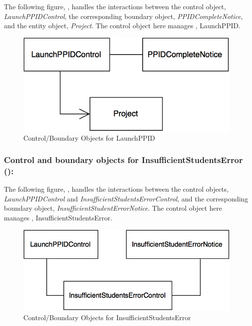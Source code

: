 \documentclass[12pt,letterpaper]{article}
\begin{document}
The following figure, , handles the interactions between the control object, {\it LaunchPPIDControl}, the corresponding boundary object, {\it PPIDCompleteNotice}, and the entity object, {\it Project}. The control object here manages , LaunchPPID.

\begin{figure}[H]
	\centering{}
	\includegraphics[scale=0.37]{imgs/cbod/launch-ppid.png}
	\caption{Control/Boundary Objects for LaunchPPID}
\end{figure}

\subsubsection*{Control and boundary objects for InsufficientStudentsError ():}

The following figure, , handles the interactions between the control objects, {\it LaunchPPIDControl} and {\it InsufficientStudentsErrorControl}, and the corresponding boundary object, {\it InsufficientStudentErrorNotice}. The control object here manages , InsufficientStudentsError.

\begin{figure}[H]
	\centering{}
	\includegraphics[scale=0.37]{imgs/cbod/insufficient-students-error.png}
	\caption{Control/Boundary Objects for InsufficientStudentsError}
\end{figure}
\end{document}
